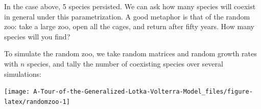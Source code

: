 \documentclass[]{book}
\newenvironment{Shaded}{\begin{snugshade}}{\end{snugshade}}
\newcommand{\CommentTok}[1]{\textcolor[rgb]{0.56,0.35,0.01}{\textit{#1}}}
\newcommand{\ControlFlowTok}[1]{\textcolor[rgb]{0.13,0.29,0.53}{\textbf{#1}}}
\newcommand{\DataTypeTok}[1]{\textcolor[rgb]{0.13,0.29,0.53}{#1}}
\newcommand{\DecValTok}[1]{\textcolor[rgb]{0.00,0.00,0.81}{#1}}
\newcommand{\KeywordTok}[1]{\textcolor[rgb]{0.13,0.29,0.53}{\textbf{#1}}}
\newcommand{\NormalTok}[1]{#1}
\newcommand{\OperatorTok}[1]{\textcolor[rgb]{0.81,0.36,0.00}{\textbf{#1}}}
\newcommand{\OtherTok}[1]{\textcolor[rgb]{0.56,0.35,0.01}{#1}}
\newcommand{\StringTok}[1]{\textcolor[rgb]{0.31,0.60,0.02}{#1}}
\begin{document}
In the case above, 5 species persisted. We can ask how many species will coexist in general under this parametrization. A good metaphor is that of the random zoo: take a large zoo, open all the cages, and return after fifty years. How many species will you find?

To simulate the random zoo, we take random matrices and random growth rates with \(n\) species, and tally the number of coexisting species over several simulations:

\begin{Shaded}
\end{Shaded}

\begin{center}\texttt{[image: A-Tour-of-the-Generalized-Lotka-Volterra-Model\_files/figure-latex/randomzoo-1]} \end{center}
\end{document}
